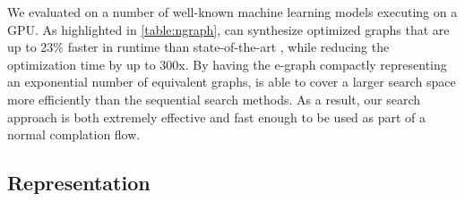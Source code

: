 
We evaluated \ourname{} on a number of well-known machine learning models executing on a GPU.
As highlighted in \autoref{table:ngraph}, \ourname{} can synthesize optimized graphs that are up to 23\% faster in runtime than state-of-the-art \cite{taso}, while reducing the optimization time by up to 300x.
By having the e-graph compactly representing an exponential number of equivalent graphs, \ourname{} is able to cover a larger search space more efficiently than the sequential search methods.
As a result, our search approach is both extremely effective and fast enough to be used as part of a normal complation flow.




\subsection{Representation}

